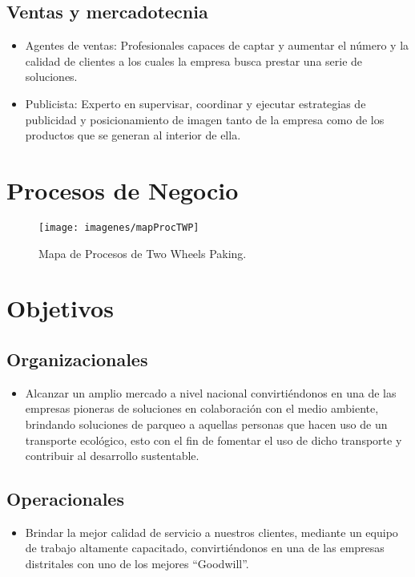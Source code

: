 \subsection{Ventas y mercadotecnia}
\begin{itemize}
	\item Agentes de ventas: Profesionales capaces de captar y aumentar el número y la calidad de clientes a los cuales la empresa busca prestar una serie de soluciones.
	\item Publicista: Experto en supervisar, coordinar y ejecutar estrategias de publicidad y posicionamiento de imagen tanto de la empresa como de los productos que se generan al interior de ella.
\end{itemize}


\section{Procesos de Negocio}
\begin{figure}[h]
	\centering
	\texttt{[image: imagenes/mapProcTWP]}
	\caption{Mapa de Procesos de Two Wheels Paking.}
	\label{fig:awesome_image}
\end{figure}

\section{Objetivos}
\subsection{Organizacionales}
\begin{itemize}
	\item Alcanzar un amplio mercado a nivel nacional convirtiéndonos en una de las empresas pioneras de soluciones en colaboración con el medio ambiente, brindando soluciones de parqueo a aquellas personas que hacen uso de un transporte ecológico, esto con el fin de fomentar el uso de dicho transporte y contribuir al desarrollo sustentable.
\end{itemize}

\subsection{Operacionales}
\begin{itemize}
	\item Brindar la mejor calidad de servicio a nuestros clientes, mediante un equipo de trabajo altamente capacitado, convirtiéndonos en una de las empresas distritales con uno de los mejores “Goodwill”.
\end{itemize}

